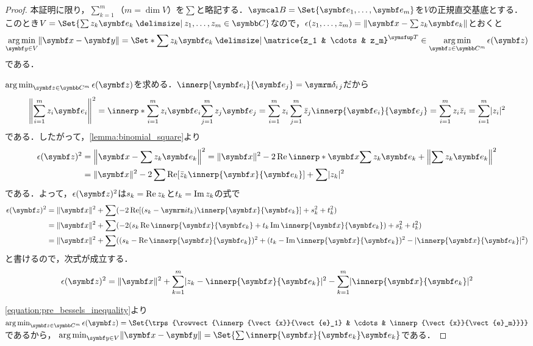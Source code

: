 \documentclass[../../main]{subfiles}
\begin{document}
\begin{proof}
  本証明に限り，\(\sum_{k=1}^m\)（\(m=\dim V\)）を\(\sum\)と略記する．\(\basis{B}=\Set{\vect{e}_1,\dots,\vect{e}_m}\)を\(V\)の正規直交基底とする．
  このとき\(V=\Set{\sum z_k\vect{e}_k\given z_1,\dots,z_m\in\numset{C}}\)なので，\(\epsilon(z_1,\dots,z_m)=\vnorm{\vect{x}-\sum z_k\vect{e}_k}\)とおくと
  \[
    \argmin_{\vect{y}\in V}\vnorm{\vect{x}-\vect{y}} = \Set*{\sum z_k\vect{e}_k\given\trps{\matrice{z_1 & \cdots & z_m}}\in\argmin_{\vect{z}\in\numset{C}^m}\epsilon(\vect{z})}
  \]
  である．

  \(\argmin_{\vect{z}\in\numset{C}^m}\epsilon(\vect{z})\)を求める．\(\innerp{\vect{e}_i}{\vect{e}_j}=\kdelta{i}{j}\)だから
  \[
    \vnorm*{\sum_{i=1}^mz_i\vect{e}_i}^2 = \innerp*{\sum_{i=1}^mz_i\vect{e}_i}{\sum_{j=1}^mz_j\vect{e}_j}
    = \sum_{i=1}^mz_i\sum_{j=1}^m\conj{z}_j\innerp{\vect{e}_i}{\vect{e}_j}
    = \sum_{i=1}^mz_i\conj{z}_i
    = \sum_{i=1}^m\abs{z_i}^2
  \]
  である．したがって，\cref{lemma:binomial_square}より
  \begin{align*}
    \epsilon(\vect{z})^2 &= \vnorm*{\vect{x}-\sum z_k\vect{e}_k}^2 = \vnorm{\vect{x}}^2-2\rpart\innerp*{\vect{x}}{\sum z_k\vect{e}_k}+\vnorm*{\sum z_k\vect{e}_k}^2 \\
    &= \vnorm{\vect{x}}^2-2\sum\rpart[\conj{z}_k\innerp{\vect{x}}{\vect{e}_k}]+\sum\abs{z_k}^2
  \end{align*}
  である．よって，\(\epsilon(\vect{z})^2\)は\(s_k=\operatorname{Re} z_k\)と\(t_k=\operatorname{Im} z_k\)の式で
  \begin{align*}
    \epsilon(\vect{z})^2 &= \vnorm{\vect{x}}^2+\sum(-2\rpart[(s_k-\iuni t_k)\innerp{\vect{x}}{\vect{e}_k}]+s_k^2+t_k^2) \\
    &= \vnorm{\vect{x}}^2+\sum(-2(s_k\rpart\innerp{\vect{x}}{\vect{e}_k}+t_k\ipart\innerp{\vect{x}}{\vect{e}_k})+s_k^2+t_k^2) \\
    &= \vnorm{\vect{x}}^2+\sum((s_k-\rpart\innerp{\vect{x}}{\vect{e}_k})^2+(t_k-\ipart\innerp{\vect{x}}{\vect{e}_k})^2-\abs{\innerp{\vect{x}}{\vect{e}_k}}^2)
  \end{align*}
  と書けるので，次式が成立する．
  \begin{equation}
    \label{equation:pre_bessels_inequality}
    \epsilon(\vect{z})^2 = \vnorm{\vect{x}}^2+\sum_{k=1}^m\abs{z_k-\innerp{\vect{x}}{\vect{e}_k}}^2-\sum_{k=1}^m\abs{\innerp{\vect{x}}{\vect{e}_k}}^2
  \end{equation}

  \cref{equation:pre_bessels_inequality}より\(\argmin_{\vect{z}\in\numset{C}^m}\epsilon(\vect{z})=\Set{\trps{\rowvect{\innerp{\vect{x}}{\vect{e}_1} & \cdots & \innerp{\vect{x}}{\vect{e}_m}}}}\)であるから，
  \(\argmin_{\vect{y}\in V}\vnorm{\vect{x}-\vect{y}}=\Set{\sum\innerp{\vect{x}}{\vect{e}_k}\vect{e}_k}\)である．
\end{proof}
\end{document}
